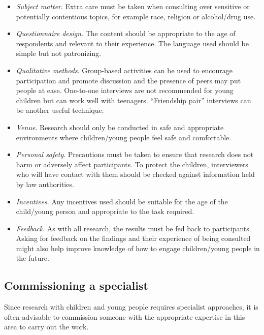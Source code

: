 \begin{itemize}
	\item \textit{Subject matter}. Extra care must be taken when consulting over sensitive or potentially contentious topics, for example race, religion or alcohol/drug use.

	\item \textit{Questionnaire design}. The content should be appropriate to the age of respondents and relevant to their experience. The language used should be simple but not patronizing.

	\item \textit{Qualitative methods}. Group-based activities can be used to encourage participation and promote discussion and the presence of peers may put people at ease. One-to-one interviews are not recommended for young children but can work well with teenagers. ``Friendship pair'' interviews can be another useful technique.

	\item \textit{Venue}. Research should only be conducted in safe and appropriate environments where children/young people feel safe and comfortable.

	\item \textit{Personal safety}. Precautions must be taken to ensure that research does not harm or adversely affect participants. To protect the children, interviewers who will have contact with them should be checked against information held by law authorities.

	\item \textit{Incentives}. Any incentives used should be suitable for the age of the child/young person and appropriate to the task required.

	\item \textit{Feedback}. As with all research, the results must be fed back to participants. Asking for feedback on the findings and their experience of being consulted might also help improve knowledge of how to engage children/young people in the future.

\end{itemize}

\subsection{Commissioning a specialist}

Since research with children and young people requires specialist approaches, it is often advisable to commission someone with the appropriate expertise in this area to carry out the work.

